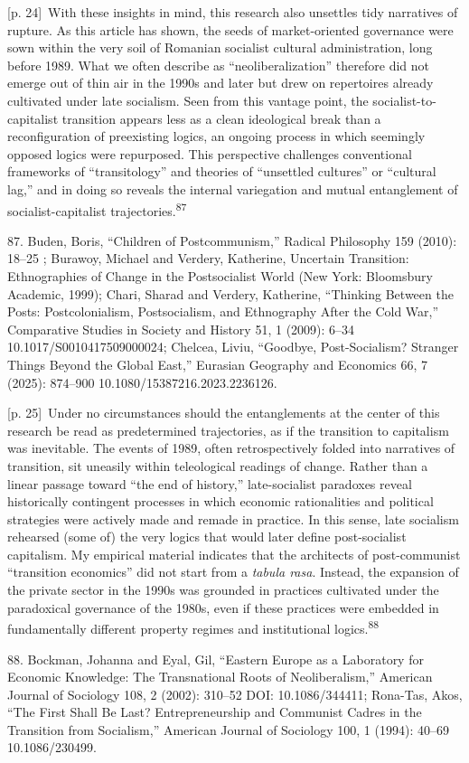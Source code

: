 \documentclass[10pt,a4paper]{article}
\begin{document}
{\scriptsize\color{gray} [p. 24]}\ With these insights in mind, this research also unsettles tidy narratives of rupture. As this article has shown, the seeds of market-oriented governance were sown within the very soil of Romanian socialist cultural administration, long before 1989. What we often describe as “neoliberalization” therefore did not emerge out of thin air in the 1990s and later but drew on repertoires already cultivated under late socialism. Seen from this vantage point, the socialist-to-capitalist transition appears less as a clean ideological break than a reconfiguration of preexisting logics, an ongoing process in which seemingly opposed logics were repurposed. This perspective challenges conventional frameworks of “transitology” and theories of “unsettled cultures” or “cultural lag,” and in doing so reveals the internal variegation and mutual entanglement of socialist-capitalist trajectories.\nobreak\textsuperscript{87}\par{\small 87. Buden, Boris, “Children of Postcommunism,” Radical Philosophy 159 (2010): 18–25 ; Burawoy, Michael and Verdery, Katherine, Uncertain Transition: Ethnographies of Change in the Postsocialist World (New York: Bloomsbury Academic, 1999); Chari, Sharad and Verdery, Katherine, “Thinking Between the Posts: Postcolonialism, Postsocialism, and Ethnography After the Cold War,” Comparative Studies in Society and History 51, 1 (2009): 6–34 10.1017/S0010417509000024; Chelcea, Liviu, “Goodbye, Post-Socialism? Stranger Things Beyond the Global East,” Eurasian Geography and Economics 66, 7 (2025): 874–900 10.1080/15387216.2023.2236126.\par}
{\scriptsize\color{gray} [p. 25]}\ Under no circumstances should the entanglements at the center of this research be read as predetermined trajectories, as if the transition to capitalism was inevitable. The events of 1989, often retrospectively folded into narratives of transition, sit uneasily within teleological readings of change. Rather than a linear passage toward “the end of history,” late-socialist paradoxes reveal historically contingent processes in which economic rationalities and political strategies were actively made and remade in practice. In this sense, late socialism rehearsed (some of) the very logics that would later define post-socialist capitalism. My empirical material indicates that the architects of post-communist “transition economics” did not start from a \textit{tabula rasa}. Instead, the expansion of the private sector in the 1990s was grounded in practices cultivated under the paradoxical governance of the 1980s, even if these practices were embedded in fundamentally different property regimes and institutional logics.\nobreak\textsuperscript{88}\par{\small 88. Bockman, Johanna and Eyal, Gil, “Eastern Europe as a Laboratory for Economic Knowledge: The Transnational Roots of Neoliberalism,” American Journal of Sociology 108, 2 (2002): 310–52 DOI: 10.1086/344411; Rona-Tas, Akos, “The First Shall Be Last? Entrepreneurship and Communist Cadres in the Transition from Socialism,” American Journal of Sociology 100, 1 (1994): 40–69 10.1086/230499.\par}
\end{document}
